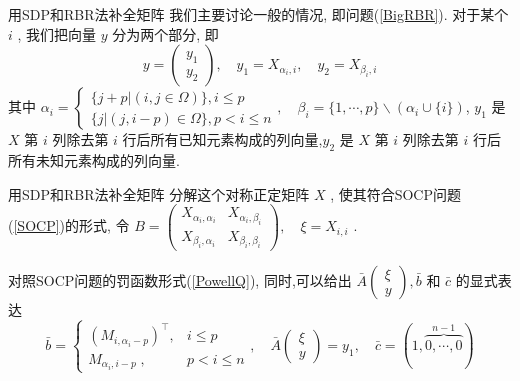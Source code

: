 \documentclass[slidestop, compress, mathserif, UTF8]{beamer}
\numberwithin{equation}{section}                                        %
\begin{document}
            \begin{frame}[t]{用SDP和RBR法补全矩阵}
                我们主要讨论一般的情况, 即问题(\ref{BigRBR}). 对于某个 $i$ , 我们把向量 $y$ 分为两个部分, 即
                \begin{equation}\label{BigRBRCondition1}
                    y = \begin{pmatrix}y_1 \\ y_2\end{pmatrix}, \quad
                    y_1 = X_{\alpha_i, i}, \quad
                    y_2 = X_{\beta_i, i}
                \end{equation}
                \small{其中
                $
                    \alpha_i=
                        \begin{cases}
                            \{j + p \vert (i, j \in \Omega)\}, i \leq p\\
                            \{j \vert (j, i - p) \in \Omega\}, p < i \leq n
                        \end{cases}
                        ,\quad
                    \beta_i = 
                        \{1, \cdots, p\} \backslash (\alpha_i \cup \{i\})
                $,
                $y_1$ 是 $X$ 第 $i$ 列除去第 $i$ 行后所有已知元素构成的列向量,$y_2$ 是 $X$ 第 $i$ 列除去第 $i$ 行后所有未知元素构成的列向量.}\normalsize
            \end{frame}
            \begin{frame}[t]{用SDP和RBR法补全矩阵}
                分解这个对称正定矩阵 $X$ , 使其符合SOCP问题(\ref{SOCP})的形式, 令
                $
                        B 
                    =	\begin{pmatrix}
                            X_{\alpha_i, \alpha_i} & X_{\alpha_i, \beta_i} \\
                            X_{\beta_i, \alpha_i} & X_{\beta_i, \beta_i}
                        \end{pmatrix} ,\quad 
                        \xi
                    =	X_{i, i}
                $ .
                
                对照SOCP问题的罚函数形式(\ref{PowellQ}), 同时,可以给出 $\bar{A} \begin{pmatrix}\xi \\ y\end{pmatrix}, \bar{b}$ 和 $\bar{c}$ 的显式表达
				\begin{equation}\label{BigRBRCondition2}
						\bar{b}
					= 	\begin{cases}
							(M_{i,\alpha_i-p})^\top,&i\leq p\\
							M_{\alpha_i,i-p}\;,&p<i\leq n
						\end{cases}
						, \quad
						\bar{A} \begin{pmatrix} \xi \\ y \end{pmatrix}
					=	y_1
						, \quad
						\bar{c}
					=	(1, \overbrace{0, \cdots, 0}^{n - 1})
				\end{equation}
            \end{frame}
\end{document}
